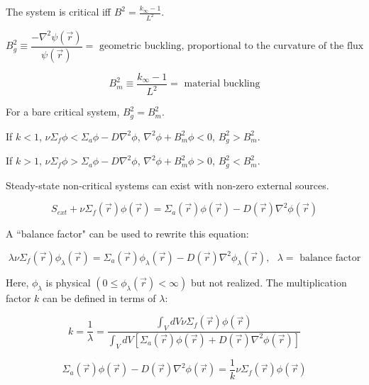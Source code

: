\documentclass[12pt]{article}
\newcommand{\rvec}{\ensuremath{\vec{r}}}
\newcommand{\vecr}{\ensuremath{\vec{r}}}
\begin{document}
The system is critical iff $B^2 = \frac{k_{\infty} - 1}{L^2}$.

\begin{equation*}
B_g^2 \equiv \frac{-\nabla^2\psi(\rvec)}{\psi(\vecr)} = 
\text{ geometric buckling, proportional to the curvature of the flux}
\end{equation*}

\begin{equation*}
B_m^2 \equiv \frac{k_{\infty} - 1}{L^2} = \text{ material buckling}
\end{equation*}

For a bare critical system, $B_g^2 = B_m^2$.


If $k < 1$, $\nu\Sigma_f\phi < \Sigma_a\phi - D\nabla^2\phi$, $\nabla^2\phi + B_m^2\phi < 0$, 
$B_g^2 > B_m^2$.


If $k > 1$, $\nu\Sigma_f\phi > \Sigma_a\phi - D\nabla^2\phi$, $\nabla^2\phi + B_m^2\phi > 0$, 
$B_g^2 < B_m^2$.


Steady-state non-critical systems can exist with non-zero external sources.

\begin{equation*}
S_{ext} + \nu\Sigma_f(\rvec)\phi(\rvec) = \Sigma_a(\rvec)\phi(\rvec) - D(\rvec)\nabla^2\phi(\rvec)
\end{equation*}

A ``balance factor" can be used to rewrite this equation:

\begin{equation*}
\lambda\nu\Sigma_f(\rvec)\phi_{\lambda}(\rvec) = 
\Sigma_a(\rvec)\phi_{\lambda}(\rvec) - D(\rvec)\nabla^2\phi_{\lambda}(\rvec), 
\text{ $\lambda =$ balance factor}
\end{equation*}

Here, $\phi_{\lambda}$ is physical $(0\leq\phi_{\lambda}(\rvec)<\infty)$ but not realized. The
multiplication factor $k$ can be defined in terms of $\lambda$:

\begin{equation*}
k = \frac{1}{\lambda} = 
\frac{\int_VdV\nu\Sigma_f(\rvec)\phi(\rvec)}{\int_VdV[\Sigma_a(\rvec)\phi(\rvec)+D(\rvec)\nabla^2\phi(\rvec)]}
\end{equation*}

\begin{equation*}
\Sigma_a(\rvec)\phi(\rvec) - D(\rvec)\nabla^2\phi(\rvec) = \frac{1}{k}\nu\Sigma_f(\rvec)\phi(\rvec)
\end{equation*}

\end{document}
